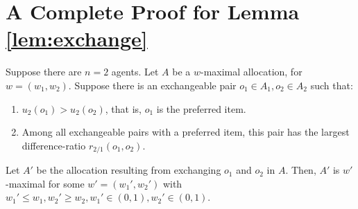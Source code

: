 \documentclass[sigconf]{aamas}
\theoremstyle{definition}
\newenvironment{customthm}[1]
  {\renewcommand\theinnercustomthm{#1}\innercustomthm}
  {\endinnercustomthm}
\begin{document}
\section{A Complete Proof for Lemma \ref{lem:exchange}}
\label{app:lem:exchange}

\begin{customthm}{\ref{lem:exchange}}
Suppose there are $n=2$ agents.
Let $A$ be a $w$-maximal allocation, for $w=(w_1,w_2)$. Suppose there is an exchangeable pair $o_1\in A_1, o_2\in A_2$ such that:
\begin{enumerate}
\item $u_2(o_1)>u_2(o_2)$, that is, $o_1$ is the preferred item.
\item Among all exchangeable pairs with a preferred item, this pair has the largest difference-ratio $r_{2/1}(o_1,o_2)$.
\end{enumerate}
Let $A'$ be the allocation resulting from exchanging $o_1$ and $o_2$ in $A$.
Then, $A'$ is $w'$-maximal for some $w' = (w_1',w_2')$ with  $w_1'\leq w_1, w_2'\geq w_2, w_1'\in(0,1), w_2'\in(0,1)$.
\end{customthm}
\end{document}

